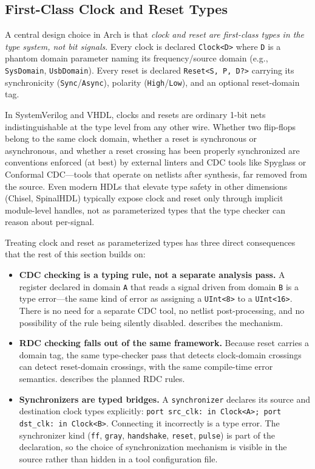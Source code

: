 \documentclass[11pt,twocolumn]{article}
\begin{document}
\subsection{First-Class Clock and Reset Types}
\label{sec:clockreset}

A central design choice in Arch is that \emph{clock and reset are first-class types in the type system, not bit signals}. Every clock is declared \texttt{Clock<D>} where \texttt{D} is a phantom domain parameter naming its frequency/source domain (e.g., \texttt{SysDomain}, \texttt{UsbDomain}). Every reset is declared \texttt{Reset<S, P, D?>} carrying its synchronicity (\texttt{Sync}/\texttt{Async}), polarity (\texttt{High}/\texttt{Low}), and an optional reset-domain tag.

In SystemVerilog and VHDL, clocks and resets are ordinary 1-bit nets indistinguishable at the type level from any other wire. Whether two flip-flops belong to the same clock domain, whether a reset is synchronous or asynchronous, and whether a reset crossing has been properly synchronized are conventions enforced (at best) by external linters and CDC tools like Spyglass or Conformal CDC---tools that operate on netlists after synthesis, far removed from the source. Even modern HDLs that elevate type safety in other dimensions (Chisel, SpinalHDL) typically expose clock and reset only through implicit module-level handles, not as parameterized types that the type checker can reason about per-signal.

Treating clock and reset as parameterized types has three direct consequences that the rest of this section builds on:

\begin{itemize}
\item \textbf{CDC checking is a typing rule, not a separate analysis pass.} A register declared in domain \texttt{A} that reads a signal driven from domain \texttt{B} is a type error---the same kind of error as assigning a \texttt{UInt<8>} to a \texttt{UInt<16>}. There is no need for a separate CDC tool, no netlist post-processing, and no possibility of the rule being silently disabled.  describes the mechanism.
\item \textbf{RDC checking falls out of the same framework.} Because reset carries a domain tag, the same type-checker pass that detects clock-domain crossings can detect reset-domain crossings, with the same compile-time error semantics.  describes the planned RDC rules.
\item \textbf{Synchronizers are typed bridges.} A \texttt{synchronizer} declares its source and destination clock types explicitly: \texttt{port src\_clk: in Clock<A>; port dst\_clk: in Clock<B>}. Connecting it incorrectly is a type error. The synchronizer kind (\texttt{ff}, \texttt{gray}, \texttt{handshake}, \texttt{reset}, \texttt{pulse}) is part of the declaration, so the choice of synchronization mechanism is visible in the source rather than hidden in a tool configuration file.
\end{itemize}
\end{document}
